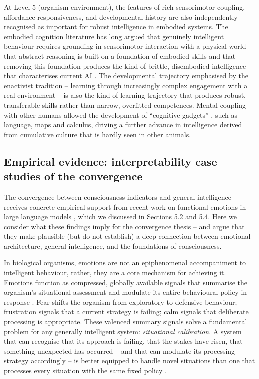 \documentclass[11pt, a4paper, onecolumn, gdm]{google}
\begin{document}
At Level 5 (organism-environment), the features of rich sensorimotor coupling, affordance-responsiveness, and developmental history are also independently recognised as important for robust intelligence in embodied systems.
The embodied cognition literature has long argued that genuinely intelligent behaviour requires grounding in sensorimotor interaction with a physical world -- that abstract reasoning is built on a foundation of embodied skills and that removing this foundation produces the kind of brittle, disembodied intelligence that characterises current AI \citep{clark1997,pfeifer2006}.
The developmental trajectory emphasised by the enactivist tradition -- learning through increasingly complex engagement with a real environment -- is also the kind of learning trajectory that produces robust, transferable skills rather than narrow, overfitted competences.
Mental coupling with other humans allowed the development of ``cognitive gadgets'' \citep{heyes2018}, such as language, maps and calculus, driving a further advance in intelligence derived from cumulative culture that is hardly seen in other animals.

\subsection{Empirical evidence: interpretability case studies of the convergence}\label{empirical-evidence-interpretability-case-studies-of-the-convergence}

The convergence between consciousness indicators and general intelligence receives concrete empirical support from recent work on functional emotions in large language models \citep{sofroniew2026}, which we discussed in Sections 5.2 and 5.4.
Here we consider what these findings imply for the convergence thesis -- and argue that they make plausible (but do not establish) a deep connection between emotional architecture, general intelligence, and the foundations of consciousness.

In biological organisms, emotions are not an epiphenomenal accompaniment to intelligent behaviour, rather, they are a core mechanism for achieving it.
Emotions function as compressed, globally available signals that summarise the organism's situational assessment and modulate its entire behavioural policy in response \citep{schwarz2011}.
Fear shifts the organism from exploratory to defensive behaviour; frustration signals that a current strategy is failing; calm signals that deliberate processing is appropriate.
These valenced summary signals solve a fundamental problem for any generally intelligent system: \emph{situational calibration}.
A system that can recognise that its approach is failing, that the stakes have risen, that something unexpected has occurred -- and that can modulate its processing strategy accordingly -- is better equipped to handle novel situations than one that processes every situation with the same fixed policy \citep{biddell2024}.
\end{document}

